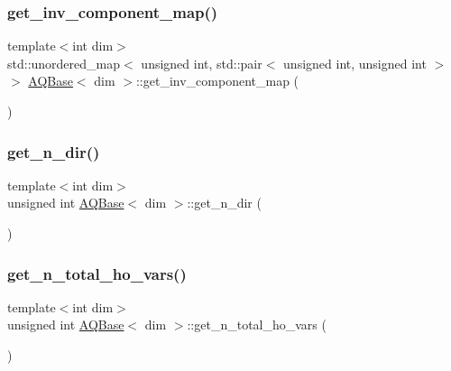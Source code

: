 \mbox{\label{class_a_q_base_a6c6f10b941afa4019a5d919eee33ebee}} 
\subsubsection{\texorpdfstring{get\+\_\+inv\+\_\+component\+\_\+map()}{get\_inv\_component\_map()}}
{\footnotesize\ttfamily template$<$int dim$>$ \\
std\+::unordered\+\_\+map$<$ unsigned int, std\+::pair$<$ unsigned int, unsigned int $>$ $>$ \hyperlink{class_a_q_base}{A\+Q\+Base}$<$ dim $>$\+::get\+\_\+inv\+\_\+component\+\_\+map (\begin{DoxyParamCaption}{ }\end{DoxyParamCaption})}

\mbox{\label{class_a_q_base_a803528777761efa898b046e374008744}} 
\subsubsection{\texorpdfstring{get\+\_\+n\+\_\+dir()}{get\_n\_dir()}}
{\footnotesize\ttfamily template$<$int dim$>$ \\
unsigned int \hyperlink{class_a_q_base}{A\+Q\+Base}$<$ dim $>$\+::get\+\_\+n\+\_\+dir (\begin{DoxyParamCaption}{ }\end{DoxyParamCaption})}

\mbox{\label{class_a_q_base_af367f668495d928c27a985b081868c6c}} 
\subsubsection{\texorpdfstring{get\+\_\+n\+\_\+total\+\_\+ho\+\_\+vars()}{get\_n\_total\_ho\_vars()}}
{\footnotesize\ttfamily template$<$int dim$>$ \\
unsigned int \hyperlink{class_a_q_base}{A\+Q\+Base}$<$ dim $>$\+::get\+\_\+n\+\_\+total\+\_\+ho\+\_\+vars (\begin{DoxyParamCaption}{ }\end{DoxyParamCaption})}

